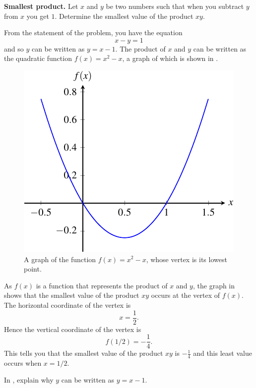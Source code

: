 \documentclass[a4paper,oneside,12pt]{article}
\begin{document}
\begin{example}
\label{eg:smallest_product}
\textbf{Smallest product.}
Let $x$ and $y$ be two numbers such that when you subtract $y$ from
$x$ you get $1$.  Determine the smallest value of the product $xy$.
\end{example}

\begin{solution}
From the statement of the problem, you have the equation
\[
x - y
=
1
\]
and so $y$ can be written as $y = x - 1$.  The product of $x$ and $y$
can be written as the quadratic function $f(x) = x^2 - x$, a graph of
which is shown in .

\begin{figure}[!htbp]
\centering
\includegraphics[scale=1.2]{image/09/smallest-product.pdf}
\caption{%
  A graph of the function $f(x) = x^2 - x$, whose vertex is its lowest
  point.
}
\label{fig:graph_smallest_product}
\end{figure}

As $f(x)$ is a function that represents the product of $x$ and $y$,
the graph in  shows that the
smallest value of the product $xy$ occurs at the vertex of $f(x)$.
The horizontal coordinate of the vertex is
\[
x
=
\frac{1}{2}.
\]
Hence the vertical coordinate of the vertex is
\[
f(1/2)
=
-\frac{1}{4}.
\]
This tells you that the smallest value of the product $xy$ is
$-\frac{1}{4}$ and this least value occurs when $x = 1/2$.
\end{solution}

\begin{exercise}
In , explain why $y$ can be written as
$y = x - 1$.
\end{exercise}
\end{document}
